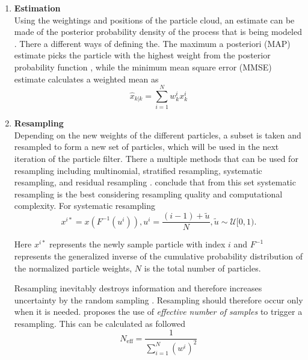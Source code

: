 \begin{enumerate}
	\item  \textbf{Estimation} \\
	Using the weightings and positions of the particle cloud, an estimate can be made of the posterior probability density of the process that is being modeled  \cite{gustafsson2010particle}. There a different ways of defining the. The maximum a posteriori (MAP) estimate picks the particle with the highest weight from the posterior probability function \cite{Saha2009}, while the  minimum mean square error (MMSE) estimate calculates a weighted mean \cite{gustafsson2010particle,Saha2009} as
	\begin{equation}
	\hat{x}_{k | k} =\sum_{i=1}^{N} w_{k}^{i} x_{k}^{i}
	\end{equation}
	
	\item \textbf{Resampling}\\
	Depending on the new weights of the different particles, a subset is taken and resampled to form a new set of particles, which will be used in the next iteration of the particle filter. There a multiple methods that can be used for resampling including multinomial, stratified resampling, systematic resampling, and	residual resampling \cite{hol2006resampling}. \citet{hol2006resampling} conclude that from this set systematic resampling is the best considering resampling quality and computational complexity. For systematic resampling
	\begin{subequations}
		\begin{equation}
		x^{i*} = x(F^{-1}(u^i)),
		\end{equation}
		\begin{equation}
		u^i = \frac{(i-1) + \tilde{u}}{N}, \tilde{u} \sim \mathcal{U}[0,1).
		\end{equation}
	\end{subequations}
	
	Here $x^{i*}$ represents the newly sample particle with index $i$ and $F^{-1}$ represents the generalized inverse of the cumulative probability distribution of the normalized particle weights, $N$ is the total number of particles. \par
	Resampling inevitably destroys information and therefore increases uncertainty by the random sampling \cite{gustafsson2010particle}. Resampling should therefore occur only when it is needed. \citet{gustafsson2010statistical} proposes the use of  \textit{effective number of samples} to trigger a  resampling. This can be calculated as followed
	\begin{subequations}
		\begin{equation}
		N_{\mathrm{eff}}=\frac{1}{\sum_{i=1}^{N}\left(w^{i}\right)^{2}}
		\end{equation}
		

\end{subequations}
\end{enumerate}
